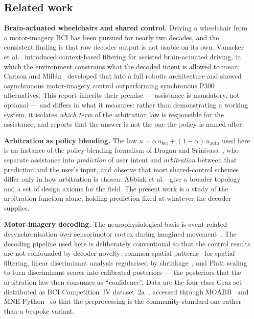 \documentclass[11pt,a4paper]{article}
\newcommand{\ubci}{u_{\mathrm{bci}}}
\newcommand{\uauto}{u_{\mathrm{auto}}}
\theoremstyle{plain}
\theoremstyle{definition}
\begin{document}
\subsection{Related work}
\label{sec:related}

\textbf{Brain-actuated wheelchairs and shared control.} Driving a
wheelchair from a motor-imagery BCI has been pursued for nearly two
decades, and the consistent finding is that raw decoder output is not
usable on its own. Vanacker et al.~\cite{vanacker2007context} introduced
context-based filtering for assisted brain-actuated driving, in which
the environment constrains what the decoded intent is allowed to mean;
Carlson and Mill\'an~\cite{carlson2013wheelchairs} developed that into a
full robotic architecture and showed asynchronous motor-imagery control
outperforming synchronous P300 alternatives. This report inherits their
premise --- assistance is mandatory, not optional --- and differs in what
it measures: rather than demonstrating a working system, it isolates
\emph{which term} of the arbitration law is responsible for the
assistance, and reports that the answer is not the one the policy is
named after.

\textbf{Arbitration as policy blending.} The law
$u = \alpha\,\ubci + (1-\alpha)\,\uauto$ used here is an instance of the
policy-blending formalism of Dragan and
Srinivasa~\cite{dragan2013blending}, who separate assistance into
\emph{prediction} of user intent and \emph{arbitration} between that
prediction and the user's input, and observe that most shared-control
schemes differ only in how arbitration is chosen. Abbink et
al.~\cite{abbink2018topology} give a broader topology and a set of design
axioms for the field. The present work is a study of the arbitration
function alone, holding prediction fixed at whatever the decoder
supplies.

\textbf{Motor-imagery decoding.} The neurophysiological basis is
event-related desynchronisation over sensorimotor cortex during imagined
movement~\cite{pfurtscheller2001mi}. The decoding pipeline used here is
deliberately conventional so that the control results are not confounded
by decoder novelty: common spatial patterns~\cite{ramoser2000csp} for
spatial filtering, linear discriminant analysis regularised by
shrinkage~\cite{blankertz2011shrinkage}, and Platt
scaling~\cite{platt1999sigmoid} to turn discriminant scores into
calibrated posteriors --- the posteriors that the arbitration law then
consumes as ``confidence''. Data are the four-class Graz set
distributed as BCI Competition~IV dataset~2a~\cite{brunner2008graz},
accessed through MOABB~\cite{jayaram2018moabb} and
MNE-Python~\cite{gramfort2013mne} so that the preprocessing is the
community-standard one rather than a bespoke variant.
\end{document}
